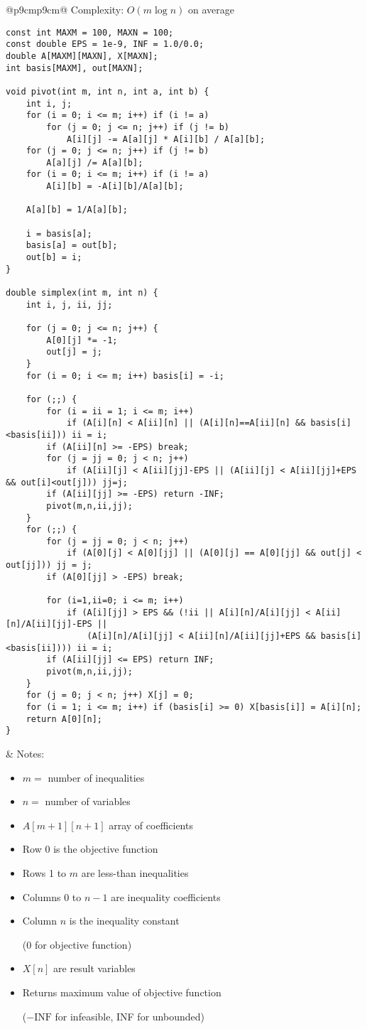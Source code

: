 \documentclass[letterpaper]{article}
\begin{document}
\begin{tabular}{@{}p{9cm}p{9cm}@{}}
Complexity: $O\left(m\log n\right)$ on average
\begin{lstlisting}
const int MAXM = 100, MAXN = 100;
const double EPS = 1e-9, INF = 1.0/0.0;
double A[MAXM][MAXN], X[MAXN];
int basis[MAXM], out[MAXN];

void pivot(int m, int n, int a, int b) {
	int i, j;
	for (i = 0; i <= m; i++) if (i != a)
		for (j = 0; j <= n; j++) if (j != b)
			A[i][j] -= A[a][j] * A[i][b] / A[a][b];
	for (j = 0; j <= n; j++) if (j != b)
		A[a][j] /= A[a][b];
	for (i = 0; i <= m; i++) if (i != a)
		A[i][b] = -A[i][b]/A[a][b];

	A[a][b] = 1/A[a][b];

	i = basis[a];
	basis[a] = out[b];
	out[b] = i;
}

double simplex(int m, int n) {
	int i, j, ii, jj;

	for (j = 0; j <= n; j++) {
		A[0][j] *= -1;
		out[j] = j;
	}
	for (i = 0; i <= m; i++) basis[i] = -i;

	for (;;) {
		for (i = ii = 1; i <= m; i++)
			if (A[i][n] < A[ii][n] || (A[i][n]==A[ii][n] && basis[i]<basis[ii])) ii = i;
		if (A[ii][n] >= -EPS) break;
		for (j = jj = 0; j < n; j++)
			if (A[ii][j] < A[ii][jj]-EPS || (A[ii][j] < A[ii][jj]+EPS && out[i]<out[j])) jj=j;
		if (A[ii][jj] >= -EPS) return -INF;
		pivot(m,n,ii,jj);
	}
	for (;;) {
		for (j = jj = 0; j < n; j++)
			if (A[0][j] < A[0][jj] || (A[0][j] == A[0][jj] && out[j] < out[jj])) jj = j;
		if (A[0][jj] > -EPS) break;

		for (i=1,ii=0; i <= m; i++)
			if (A[i][jj] > EPS && (!ii || A[i][n]/A[i][jj] < A[ii][n]/A[ii][jj]-EPS ||
				(A[i][n]/A[i][jj] < A[ii][n]/A[ii][jj]+EPS && basis[i]<basis[ii]))) ii = i;
		if (A[ii][jj] <= EPS) return INF;
		pivot(m,n,ii,jj);
	}
	for (j = 0; j < n; j++) X[j] = 0;
	for (i = 1; i <= m; i++) if (basis[i] >= 0) X[basis[i]] = A[i][n];
	return A[0][n];
}
\end{lstlisting}
&
Notes:
\begin{itemize}
\item $m=$ number of inequalities
\item $n=$ number of variables
\item $A\left[m+1\right]\left[n+1\right]$ array of coefficients
\item Row 0 is the objective function
\item Rows 1 to $m$ are less-than inequalities
\item Columns 0 to $n-1$ are inequality coefficients
\item Column $n$ is the inequality constant

(0 for objective function)
\item $X[n]$ are result variables
\item Returns maximum value of objective function

($-\mathrm{INF}$ for infeasible, INF for unbounded)
\end{itemize}
\end{tabular}
\end{document}
